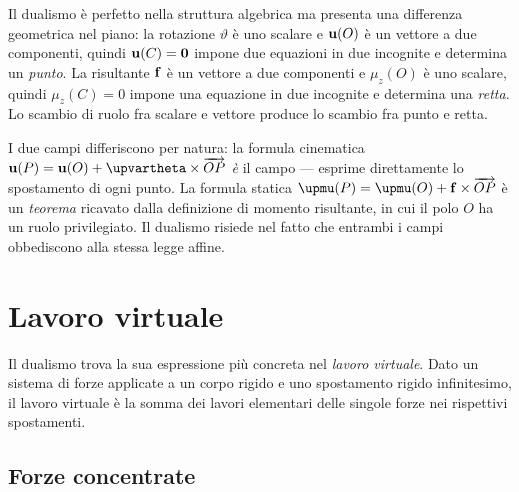 \begin{oss}
	Il dualismo è perfetto nella struttura algebrica ma
	presenta una differenza geometrica nel piano: la rotazione
	$\vartheta$ è uno scalare e $\mathbf{u}(O)$ è un vettore a due
	componenti, quindi $\mathbf{u}(C)=\mathbf{0}$ impone due equazioni
	in due incognite e determina un \textit{punto}. La
	risultante $\mathbf{f}$ è un vettore a due componenti e
	$\mu_z(O)$ è uno scalare, quindi $\mu_z(C)=0$ impone una
	equazione in due incognite e determina una \textit{retta}.
	Lo scambio di ruolo fra scalare e vettore produce lo
	scambio fra punto e retta.
\end{oss}



\begin{oss}
	I due campi differiscono per natura: la formula
	cinematica $\ub(P) = \ub(O) + \bm{\upvartheta}\times\overrightarrow{OP}$ \textit{è} il campo --- esprime direttamente
	lo spostamento di ogni punto. La formula statica $\bm{\upmu}(P) = \bm{\upmu}(O)
	+ \fb\times\overrightarrow{OP}$ è un
	\textit{teorema} ricavato dalla definizione di momento
	risultante, in cui il polo $O$ ha un ruolo privilegiato.
	Il dualismo risiede nel fatto che entrambi i campi
	obbediscono alla stessa legge affine.
\end{oss}


\section{Lavoro virtuale}\label{sec:lavoro_virtuale}

Il dualismo trova la sua espressione più concreta nel
\textit{lavoro virtuale}. Dato un sistema di forze applicate
a un corpo rigido e uno spostamento rigido infinitesimo,
il lavoro virtuale è la somma dei lavori elementari delle
singole forze nei rispettivi spostamenti.

\subsection{Forze concentrate}

